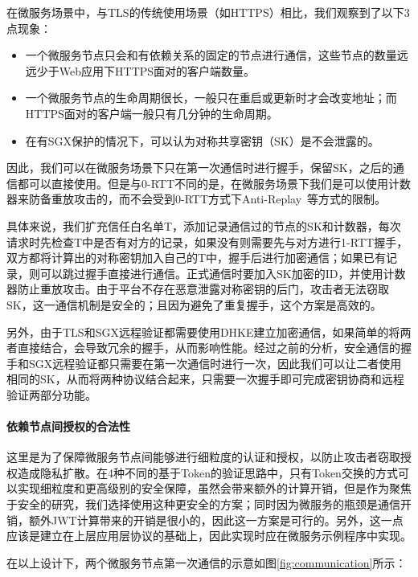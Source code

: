 在微服务场景中，与TLS的传统使用场景（如HTTPS）相比，我们观察到了以下3点现象：

\begin{itemize}
    \item 一个微服务节点只会和有依赖关系的固定的节点进行通信，这些节点的数量远远少于Web应用下HTTPS面对的客户端数量。
    \item 一个微服务节点的生命周期很长，一般只在重启或更新时才会改变地址；而HTTPS面对的客户端一般只有几分钟的生命周期。
    \item 在有SGX保护的情况下，可以认为对称共享密钥（SK）是不会泄露的。
\end{itemize}

因此，我们可以在微服务场景下只在第一次通信时进行握手，保留SK，之后的通信都可以直接使用。但是与0-RTT不同的是，在微服务场景下我们是可以使用计数器来防备重放攻击的，而不会受到0-RTT方式下Anti-Replay~\cite{8446}等方式的限制。

具体来说，我们扩充信任白名单T，添加记录通信过的节点的SK和计数器，每次请求时先检查T中是否有对方的记录，如果没有则需要先与对方进行1-RTT握手，双方都将计算出的对称密钥加入自己的T中，握手后进行加密通信；如果已有记录，则可以跳过握手直接进行通信。正式通信时要加入SK加密的ID，并使用计数器防止重放攻击。由于平台不存在恶意泄露对称密钥的后门，攻击者无法窃取SK，这一通信机制是安全的；且因为避免了重复握手，这个方案是高效的。

另外，由于TLS和SGX远程验证都需要使用DHKE建立加密通信，如果简单的将两者直接结合，会导致冗余的握手，从而影响性能。经过之前的分析，安全通信的握手和SGX远程验证都只需要在第一次通信时进行一次，因此我们可以让二者使用相同的SK，从而将两种协议结合起来，只需要一次握手即可完成密钥协商和远程验证两部分功能。

\paragraph{依赖节点间授权的合法性}
这里是为了保障微服务节点间能够进行细粒度的认证和授权，以防止攻击者窃取授权造成隐私扩散。在4种不同的基于Token的验证思路中，只有Token交换的方式可以实现细粒度和更高级别的安全保障，虽然会带来额外的计算开销，但是作为聚焦于安全的研究，我们选择使用这种更安全的方案；同时因为微服务的瓶颈是通信开销，额外JWT计算带来的开销是很小的，因此这一方案是可行的。另外，这一点应该是建立在上层应用层协议的基础上，因此实现时应在微服务示例程序中实现。

在以上设计下，两个微服务节点第一次通信的示意如图\ref{fig:communication}所示：

